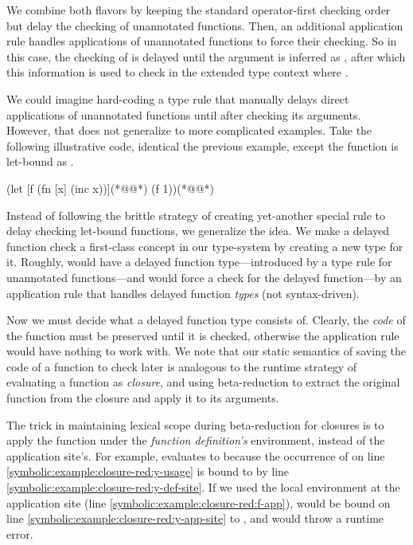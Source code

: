 We combine both flavors by keeping the standard operator-first checking order
but delay the checking of unannotated functions.
Then, an additional application rule handles applications of
unannotated functions to force their checking.
So in this case, the checking of 
is delayed until the argument  is inferred as ,
after which this information is used to check 
in the extended type context where .

We could imagine hard-coding a type rule that manually delays
direct applications of unannotated functions until after checking
its arguments.
However, that does not generalize to more complicated examples.
Take the following illustrative code, identical the previous
example, except the function is let-bound as .

{
\lstset{numbers=left}
\begin{cljlisting}
(let [f (fn [x] (inc x))](*@\label{symbolic:example:let-bound:def-f}@*)
  (f 1))(*@\label{symbolic:example:let-bound:app-f}@*)
\end{cljlisting}
}

Instead of following the brittle strategy of creating yet-another special rule to delay checking
let-bound functions, we generalize the idea.
We make a delayed function check a first-class concept in our type-system by
creating a new type for it.
Roughly,  would have a delayed function type---introduced by
a type rule for unannotated functions---and 
would force a check for the delayed function---by an application
rule that handles delayed function \emph{types} (not syntax-driven).

Now we must decide what a delayed function type consists of.
Clearly, the \emph{code} of the function must be preserved until
it is checked, otherwise the application rule would have nothing
to work with.
We note that our static semantics of saving
the code of a function to check later
is analogous to the runtime strategy of
evaluating a function as \emph{closure},
and using beta-reduction to extract the original
function from the closure and apply it to its arguments.

The trick in maintaining lexical scope during beta-reduction for closures
is to apply the function under the \emph{function definition's}
environment, instead of the application site's.
For example,
evaluates
to 
because
the occurrence of
 on line \ref{symbolic:example:closure-red:y-usage}
is bound to  by line \ref{symbolic:example:closure-red:y-def-site}.
If we used the local environment at the application site (line \ref{symbolic:example:closure-red:f-app}),
 would be bound on line \ref{symbolic:example:closure-red:y-app-site}
to ,
and would throw a runtime error.

